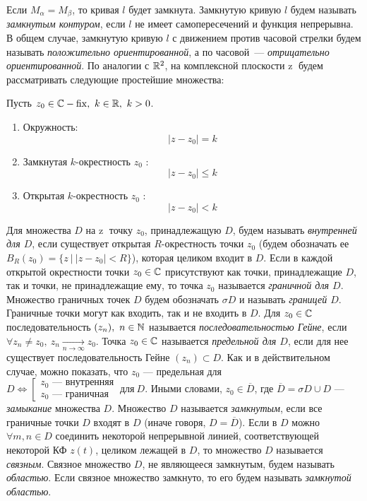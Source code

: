 \documentclass[../../main.tex]{subfiles}
\begin{document}
Если  $M_{\alpha} = M_{\beta}$, то кривая $l$ будет замкнута. 
Замкнутую кривую  $l$ будем называть \emph{замкнутым контуром},
если $l$ не имеет самопересечений и функция непрерывна. В общем
случае, замкнутую кривую  $l$ с движением против часовой стрелки
будем называть \emph{положительно ориентированной}, 
а по часовой~---
\emph{отрицательно ориентированной}. По аналогии  с $\mathbb{R}^2$,
 на комплексной плоскости  \textcircled{z} будем рассматривать следующие  простейшие множества:

Пусть $z_0\in \mathbb{C} - \operatorname{fix},\ k \in \mathbb{R},\ k > 0$.
\begin{enumerate}
\item Окружность: \[  |z - z_0| = k\] 
\item Замкнутая $k$-окрестность $z_0$ : \[ |z - z_0| \leq k\] 
\item Открытая $k$-окрестность $z_0$ : \[ |z - z_0| < k\] 
\end{enumerate}

Для множества $D$ на \textcircled{z} точку $z_0$, принадлежащую  $D$, 
будем называть \emph{внутренней для  $D$}, если существует открытая 
$R$-окрестность точки $z_0$ (будем обозначать ее
$B_R(z_0) = \{ z\ |\  |z - z_0| < R \}$), которая целиком входит в  $D$.
Если в каждой открытой окрестности точки 
$z_0 \in \mathbb{C}$ присутствуют как точки, принадлежащие $D$, 
так и точки, не принадлежащие ему, то точка $z_0$ называется 
\emph{граничной для $D$}.
Множество граничных точек $D$ будем обозначать $\sigma\!{D}$ и 
называть \emph{границей $D$}.
Граничные точки могут как входить, так и не входить в $D$. Для $z_0 \in \mathbb{C}$
последовательность
$(z_n),\ n\in\mathbb{N}$ называется \emph{последовательностью Гейне}, если $\forall
z_n\neq z_0, \ z_n \underset{n \longrightarrow \infty}{\longrightarrow} z_0 $.
 Точка $z_0 \in \mathbb{C}$ называется \emph{предельной для $D$},
если для нее существует последовательность Гейне $(z_n) \subset D$. Как и в
действительном случае, можно показать,
 что $z_0$ --- предельная для $D \iff
 \left[\begin{aligned} 
  z_0 \text{ --- внутренняя} \\
  z_0 \text{ --- граничная}
\end{aligned}\right. \ \text{для}\ D$. Иными словами, $z_0 \in \overline{D}$, где
$\overline{D} = \sigma\!{D}\cup D$ --- \emph{замыкание} множества $D$.
 Множество $D$ называется \emph{замкнутым}, если все граничные точки $D$
 входят в $D$ (иначе говоря, $D = \overline{D}$). 
Если в $D$ можно $\forall m, n \in D$ соединить некоторой непрерывной линией,
соответствующей некоторой
 КФ $z(t)$, целиком лежащей в $D$, то множество $D$ называется  \emph{связным}.
Связное множество $D$, не являющееся замкнутым, будем называть \emph{областью}.
Если связное множество замкнуто, то его будем называть \emph{замкнутой
областью}.
 
\end{document}
